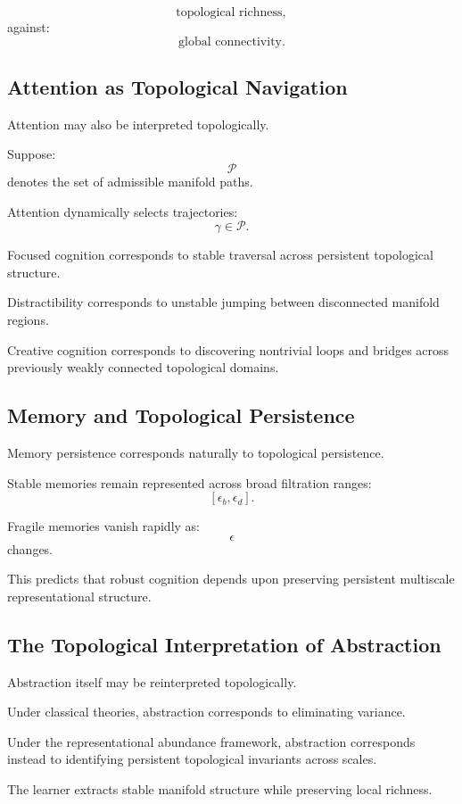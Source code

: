 \documentclass[12pt,a4paper]{article}
\begin{document}
\[
\text{topological richness},
\]
against:
\[
\text{global connectivity}.
\]

\subsection{Attention as Topological Navigation}

Attention may also be interpreted topologically.

Suppose:
\[
\mathcal{P}
\]
denotes the set of admissible manifold paths.

Attention dynamically selects trajectories:
\[
\gamma
\in
\mathcal{P}.
\]

Focused cognition corresponds to stable traversal across persistent topological structure.

Distractibility corresponds to unstable jumping between disconnected manifold regions.

Creative cognition corresponds to discovering nontrivial loops and bridges across previously weakly connected topological domains.

\subsection{Memory and Topological Persistence}

Memory persistence corresponds naturally to topological persistence.

Stable memories remain represented across broad filtration ranges:
\[
[\epsilon_b,\epsilon_d].
\]

Fragile memories vanish rapidly as:
\[
\epsilon
\]
changes.

This predicts that robust cognition depends upon preserving persistent multiscale representational structure.

\subsection{The Topological Interpretation of Abstraction}

Abstraction itself may be reinterpreted topologically.

Under classical theories, abstraction corresponds to eliminating variance.

Under the representational abundance framework, abstraction corresponds instead to identifying persistent topological invariants across scales.

The learner extracts stable manifold structure while preserving local richness.
\end{document}
